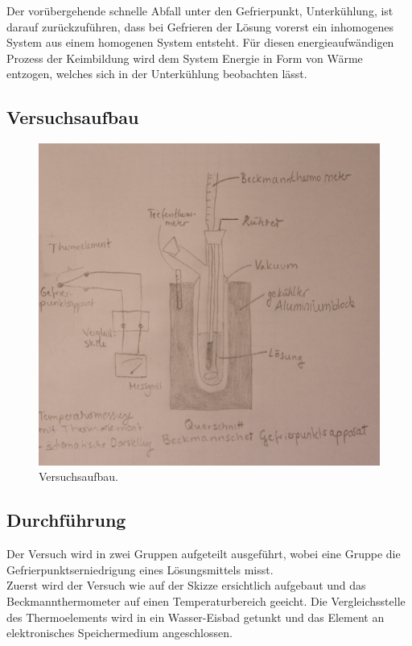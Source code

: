 \documentclass[12pt,a4paper,titlepage,headinclude,bibtotoc]{scrartcl}
\begin{document}
Der vorübergehende schnelle Abfall unter den Gefrierpunkt, Unterkühlung, ist darauf zurückzuführen, dass bei Gefrieren der Lösung vorerst ein inhomogenes System aus einem homogenen System entsteht. Für diesen energieaufwändigen Prozess der Keimbildung wird dem System Energie in Form von Wärme entzogen, welches sich in der Unterkühlung beobachten lässt.


\subsection{Versuchsaufbau}



\begin{figure} [h!]
\begin{center}
\includegraphics[scale=0.8]{Versuchsaufbau2.png} \end{center}
\caption{Versuchsaufbau.}
\end{figure}

\subsection{Durchführung}

Der Versuch wird in zwei Gruppen aufgeteilt ausgeführt, wobei eine Gruppe die Gefrierpunktserniedrigung eines Lösungsmittels misst. \\
Zuerst wird der Versuch wie auf der Skizze ersichtlich aufgebaut und das Beckmannthermometer auf einen Temperaturbereich geeicht.
 Die Vergleichsstelle des Thermoelements wird in ein Wasser-Eisbad getunkt und das Element an elektronisches Speichermedium angeschlossen.\\
 
\end{document}
